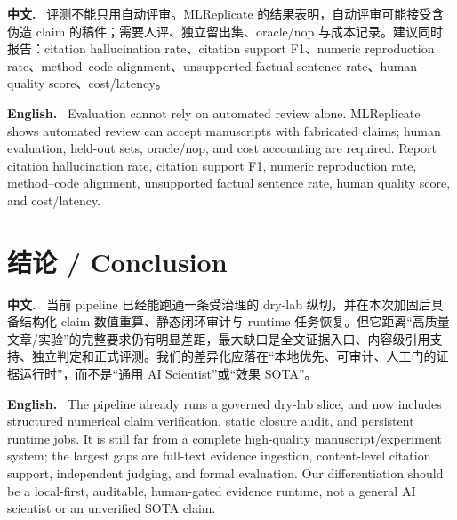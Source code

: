 \documentclass[UTF8,11pt]{ctexart}
\newcommand{\zh}{\par\noindent\textbf{中文.}\ }
\newcommand{\en}{\par\noindent\textbf{English.}\ }
\begin{document}
\zh
评测不能只用自动评审。MLReplicate 的结果表明，自动评审可能接受含伪造 claim 的稿件；需要人评、独立留出集、oracle/nop 与成本记录。建议同时报告：citation hallucination rate、citation support F1、numeric reproduction rate、method--code alignment、unsupported factual sentence rate、human quality score、cost/latency。
\en
Evaluation cannot rely on automated review alone. MLReplicate shows automated review can accept manuscripts with fabricated claims; human evaluation, held-out sets, oracle/nop, and cost accounting are required. Report citation hallucination rate, citation support F1, numeric reproduction rate, method--code alignment, unsupported factual sentence rate, human quality score, and cost/latency.

\section{结论 / Conclusion}

\zh
当前 pipeline 已经能跑通一条受治理的 dry-lab 纵切，并在本次加固后具备结构化 claim 数值重算、静态闭环审计与 runtime 任务恢复。但它距离“高质量文章/实验”的完整要求仍有明显差距，最大缺口是全文证据入口、内容级引用支持、独立判定和正式评测。我们的差异化应落在“本地优先、可审计、人工门的证据运行时”，而不是“通用 AI Scientist”或“效果 SOTA”。

\en
The pipeline already runs a governed dry-lab slice, and now includes structured numerical claim verification, static closure audit, and persistent runtime jobs. It is still far from a complete high-quality manuscript/experiment system; the largest gaps are full-text evidence ingestion, content-level citation support, independent judging, and formal evaluation. Our differentiation should be a local-first, auditable, human-gated evidence runtime, not a general AI scientist or an unverified SOTA claim.
\end{document}
